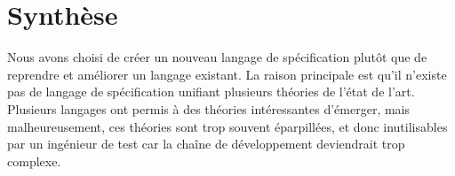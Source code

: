 \section{Synthèse}

Nous avons choisi de créer un nouveau langage de spécification plutôt que de
reprendre et améliorer un langage existant.
La raison principale est qu'il n'existe pas de langage de spécification unifiant
plusieurs théories de l'état de l'art. Plusieurs langages ont permis à des
théories intéressantes d'émerger, mais malheureusement, ces théories sont
trop souvent éparpillées, et donc inutilisables par un ingénieur de test car la
chaîne de développement deviendrait trop complexe.


